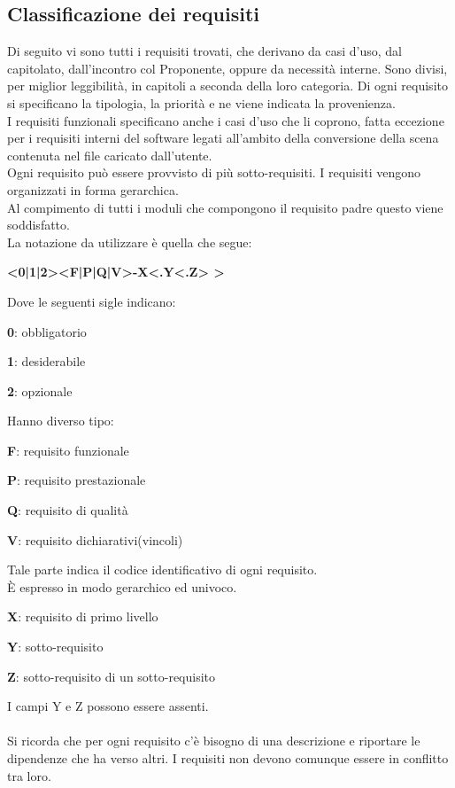 \documentclass[12pt,a4paper,titlepage]{article}
\begin{document}
	\subsection{Classificazione dei requisiti}
	Di seguito vi sono tutti i requisiti trovati, che derivano da casi d'uso, dal capitolato, dall'incontro col Proponente, oppure da necessità interne. Sono divisi, per miglior leggibilità, in capitoli a seconda della loro categoria. Di ogni requisito si specificano la tipologia, la priorità e ne viene indicata la provenienza. \\
	I requisiti funzionali specificano anche i casi d'uso che li coprono, fatta eccezione per i requisiti interni del software legati all'ambito della conversione della scena contenuta nel file caricato dall'utente. \\
	Ogni requisito può essere provvisto di più sotto-requisiti. I requisiti vengono organizzati in forma gerarchica.\\
	Al compimento di tutti i moduli che compongono il requisito padre questo viene soddisfatto.\\
	La notazione da utilizzare è quella che segue:
	\begin{center}
		\textbf{ <0|1|2><F|P|Q|V>-X<.Y<.Z> > }
	\end{center}
	Dove le seguenti sigle indicano:
	\begin{trivlist}
		\item \textbf{0}: obbligatorio
		\item \textbf{1}: desiderabile
		\item \textbf{2}: opzionale
	\end{trivlist} 
	Hanno diverso tipo:
	\begin{trivlist}
		\item \textbf{F}: requisito funzionale
		\item \textbf{P}: requisito prestazionale
		\item \textbf{Q}: requisito di qualità
		\item \textbf{V}: requisito dichiarativi(vincoli)
	\end{trivlist} 
	Tale parte indica il codice identificativo di ogni requisito.\\
	È espresso in modo gerarchico ed univoco.
	\begin{trivlist}
		\item \textbf{X}: requisito di primo livello
		\item \textbf{Y}: sotto-requisito
		\item \textbf{Z}: sotto-requisito di un sotto-requisito
	\end{trivlist} 
	I campi Y e Z possono essere assenti.\\
	\\
	Si ricorda che per ogni requisito c'è bisogno di una descrizione e riportare le dipendenze che ha verso altri. I requisiti non devono comunque essere in conflitto tra loro.
	\newpage
\end{document}
